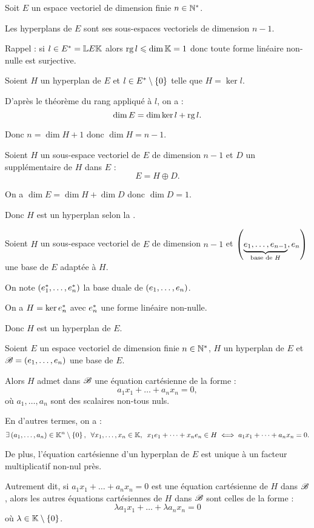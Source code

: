 \begin{prop}
Soit \(E\) un espace vectoriel de dimension finie \(n\in\mathbb{N}^*\).

Les hyperplans de \(E\) sont ses sous-espaces vectoriels de dimension \(n-1\).
\end{prop}

\begin{dem}
Rappel : si \(l\in E^{*}=\mathbb{L}{E}{\mathbb{K}}\) alors \(\operatorname{rg} l\leqslant\dim\mathbb{K}=1\) donc toute forme linéaire non-nulle est surjective.

\incdir

Soient \(H\) un hyperplan de \(E\) et \(l\in E^{*}\setminus\left\lbrace0\right\rbrace\) telle que \(H=\ker l\).

D'après le théorème du rang appliqué à \(l\), on a : \[\dim E=\dim\ker l+\operatorname{rg} l.\]

Donc \(n=\dim H+1\) donc \(\dim H=n-1\).

\increc

Soient \(H\) un sous-espace vectoriel de \(E\) de dimension \(n-1\) et \(D\) un supplémentaire de \(H\) dans \(E\) : \[E=H\oplus D.\]

On a \(\dim E=\dim H+\dim D\) donc \(\dim D=1\).

Donc \(H\) est un hyperplan selon la .
\end{dem}

\begin{dem}
Soient \(H\) un sous-espace vectoriel de \(E\) de dimension \(n-1\) et \(\left(\underbrace{e_1,\dots,e_{n-1}}_{\text{base de }H},e_n\right)\) une base de \(E\) adaptée à \(H\).

On note \(\left(e_1^{*},\dots,e_n^{*}\right)\) la base duale de \(\left(e_1,\dots,e_n\right)\).

On a \(H=\ker e_n^{*}\) avec \(e_n^{*}\) une forme linéaire non-nulle.

Donc \(H\) est un hyperplan de \(E\).
\end{dem}

\begin{prop}
Soient \(E\) un espace vectoriel de dimension finie \(n\in\mathbb{N}^*\), \(H\) un hyperplan de \(E\) et \(\mathscr{B}=\left(e_1,\dots,e_n\right)\) une base de \(E\).

Alors \(H\) admet dans \(\mathscr{B}\) une équation cartésienne de la forme : \[a_1x_1+\dots+a_nx_n=0,\] où \(a_1,\dots,a_n\) sont des scalaires non-tous nuls.

En d'autres termes, on a : \[\quantifs{\exists\paren{a_1,\dots,a_n}\in\K^n\excluant\accol{0};\forall x_1,\dots,x_n\in\K}x_1e_1+\dots+x_ne_n\in H\ssi a_1x_1+\dots+a_nx_n=0.\]

De plus, l'équation cartésienne d'un hyperplan de \(E\) est unique à un facteur multiplicatif non-nul près.

Autrement dit, si \(a_1x_1+\dots+a_nx_n=0\) est une équation cartésienne de \(H\) dans \(\mathscr{B}\), alors les autres équations cartésiennes de \(H\) dans \(\mathscr{B}\) sont celles de la forme : \[\lambda a_1x_1+\dots+\lambda a_nx_n=0\] où \(\lambda\in\mathbb{K}\setminus\left\lbrace0\right\rbrace\).
\end{prop}

